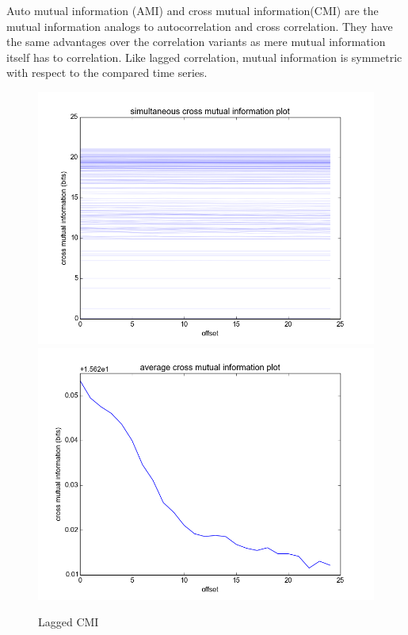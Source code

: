 \documentclass[12pt]{article}
\begin{document}
Auto mutual information (AMI) and cross mutual information(CMI) are the mutual information analogs to autocorrelation and cross correlation. They have the same advantages over the correlation variants as mere mutual information itself has to correlation. Like lagged correlation, mutual information is symmetric with respect to the compared time series.

\begin{figure}
  \centering
  \includegraphics[scale=0.4]{cmi_mc}
  \includegraphics[scale=0.4]{cmi_summary}
  \caption{Lagged CMI}
  \label{fig:lag_cmi}
\end{figure}
\end{document}
